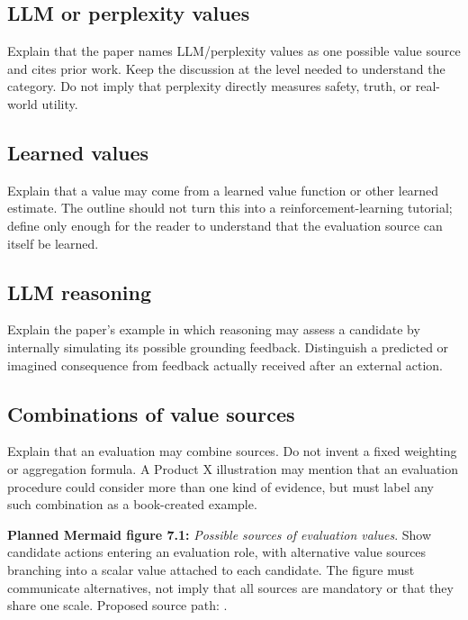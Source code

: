 \subsection{LLM or perplexity values}
Explain that the paper names LLM/perplexity values as one possible value source and cites prior work. Keep the discussion at the level needed to understand the category. Do not imply that perplexity directly measures safety, truth, or real-world utility.
\subsection{Learned values}
Explain that a value may come from a learned value function or other learned estimate. The outline should not turn this into a reinforcement-learning tutorial; define only enough for the reader to understand that the evaluation source can itself be learned.
\subsection{LLM reasoning}
Explain the paper's example in which reasoning may assess a candidate by internally simulating its possible grounding feedback. Distinguish a predicted or imagined consequence from feedback actually received after an external action.
\subsection{Combinations of value sources}
Explain that an evaluation may combine sources. Do not invent a fixed weighting or aggregation formula. A Product X illustration may mention that an evaluation procedure could consider more than one kind of evidence, but must label any such combination as a book-created example.

\textbf{Planned Mermaid figure 7.1:} \emph{Possible sources of evaluation values}. Show candidate actions entering an evaluation role, with alternative value sources branching into a scalar value attached to each candidate. The figure must communicate alternatives, not imply that all sources are mandatory or that they share one scale. Proposed source path: .

